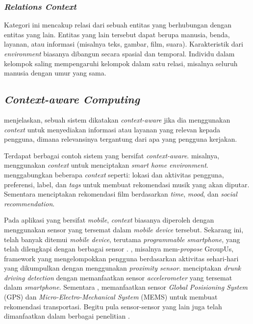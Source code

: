 \subsubsection{\textit{Relations Context}}
\label{sssec:relations-context}
Kategori ini mencakup relasi dari sebuah entitas yang berhubungan dengan entitas yang lain. Entitas yang lain tersebut dapat berupa manusia, benda, layanan, atau informasi (misalnya teks, gambar, film, suara). Karakteristik dari \textit{environment} biasanya dibangun secara spasial dan temporal. Individu dalam kelompok saling mempengaruhi kelompok dalam satu relasi, misalnya seluruh manusia dengan umur yang sama.


\subsection{\textit{Context-aware Computing}}
\label{ssec:context-aware-computing}
\citep{dey_understanding_2001} menjelaskan, sebuah sistem dikatakan \textit{context-aware} jika dia menggunakan \textit{context} untuk menyediakan informasi atau layanan yang relevan kepada pengguna, dimana relevansinya tergantung dari apa yang pengguna kerjakan.


Terdapat berbagai contoh sistem yang bersifat \textit{context-aware}. \citep{tsai_context-aware_2016} misalnya, menggunakan \textit{context} untuk menciptakan \textit{smart home environment}. \citep{magara_mplist:_2016} menggabungkan beberapa \textit{context} seperti: lokasi dan aktivitas pengguna, preferensi, label, dan \textit{tags} untuk membuat rekomendasi musik yang akan diputar. Sementara \citep{said_introduction_2013} menciptakan rekomendasi film berdasarkan \textit{time}, \textit{mood}, dan \textit{social recommendation}.


Pada aplikasi yang bersifat \textit{mobile}, \textit{context} biasanya diperoleh dengan menggunakan sensor yang tersemat dalam \textit{mobile device} tersebut. Sekarang ini, telah banyak ditemui \textit{mobile device}, terutama \textit{programmable smartphone}, yang telah dilengkapi dengan berbagai sensor \citep{cao_mobile_2015}. \citep{do_groupus:_2011}, misalnya mem-\textit{propose} GroupUs, framework yang mengelompokkan pengguna berdasarkan aktivitas sehari-hari yang dikumpulkan dengan menggunakan \textit{proximity sensor}. \citep{dai_mobile_2010} menciptakan \textit{drunk driving detection} dengan memanfaatkan sensor \textit{accelerometer} yang tersemat dalam \textit{smartphone}. Sementara \citep{zou_context-aware_2016}, memanfaatkan sensor \textit{Global Posisioning System} (GPS) dan \textit{Micro-Electro-Mechanical System} (MEMS) untuk membuat rekomendasi transportasi. Begitu pula sensor-sensor yang lain juga telah dimanfaatkan dalam berbagai penelitian \citep{dai_perfalld:_2010, lu_soundsense:_2009, bao_movi:_2010, rubel_toward_2005, atzmueller_towards_2013}.


